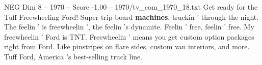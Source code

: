 \begin{textsample}{NEG Dim 8 – 1970 – Score -1.00 – 1970/tv\_com\_1970\_18.txt}  \label{ex:f8_neg_018}
Get ready for the Tuff Freewheeling Ford!
Super trip-board \textbf{machines}, truckin ' through the night.
The feelin ' is freewheelin ', the feelin 's dynamite.
Feelin ' free, feelin ' free.
My freewheelin ' Ford is TNT.
Freewheelin ' means you get custom option packages right from Ford.
Like pinstripes on flare sides, custom van interiors, and more.
Tuff Ford, America 's best-selling truck line.

\end{textsample}
